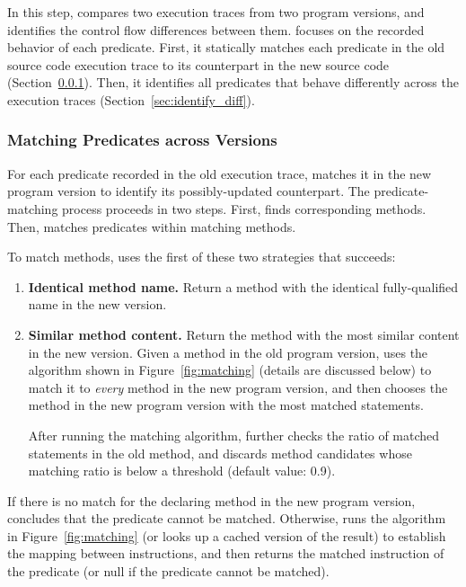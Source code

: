 

In this step, \ourtool compares two execution traces
from two program versions, and identifies the
control flow differences between them. \ourtool focuses on the
recorded behavior of each predicate.
First, it statically
matches each predicate in the old
source code execution trace to its counterpart in the new source code
(Section~\ref{sec:match_predicate}).
Then, it identifies all predicates that
behave differently across the execution traces (Section~\ref{sec:identify_diff}).


\subsubsection{Matching Predicates across Versions}
\label{sec:match_predicate}

For each predicate recorded in the old execution trace,
\ourtool matches it in the new program version to identify
its possibly-updated counterpart.
The predicate-matching process proceeds in two steps.
First, \ourtool finds corresponding methods.
Then, \ourtool matches predicates within matching methods.

To match methods, \ourtool uses
the first of these two strategies that succeeds:


\vspace{-1mm}

\begin{enumerate}
\item \textbf{Identical method name.} Return a method with the identical
fully-qualified name in the new version.
\item \textbf{Similar method content.} Return the method with
the most similar content in the new version. Given
a method in the old program version, \ourtool
uses the algorithm shown in Figure~\ref{fig:matching}
(details are discussed below) to match it
to \textit{every} method in the new program version, and then
chooses the method in the new program version with the most matched statements.

After running the matching algorithm, \ourtool further checks the ratio of
matched statements in the old method, and discards method candidates whose
matching ratio is below a threshold (default value: 0.9).
\end{enumerate}


If there is no match for the declaring method in the new program
version, \ourtool concludes that the predicate cannot be
matched. Otherwise, \ourtool runs the algorithm
in Figure~\ref{fig:matching} (or looks up a cached version of the result)
to establish the mapping between
instructions, and then returns the matched instruction of the
predicate (or null if the predicate cannot be matched).


